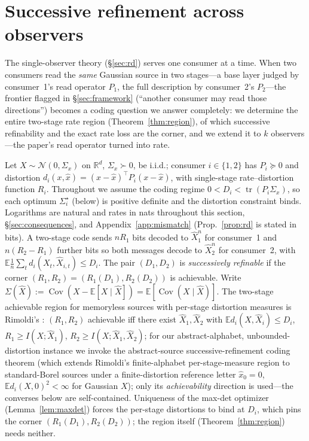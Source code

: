 \documentclass[lettersize,onecolumn]{IEEEtran}
\theoremstyle{definition}
\theoremstyle{remark}
\newcommand{\tr}{\operatorname{tr}}
\newcommand{\E}{\mathbb{E}}
\newcommand{\Cov}{\operatorname{Cov}}
\begin{document}
\section{Successive refinement across observers}\label{sec:multiobs}

The single-observer theory (\S\ref{sec:rd}) serves one consumer at a time. When two
consumers read the \emph{same} Gaussian source in two stages---a base layer judged by
consumer~1's read operator $P_1$, the full description by consumer~2's $P_2$---the
frontier flagged in \S\ref{sec:framework} (``another consumer may read those
directions'') becomes a coding question we answer completely: we determine the entire two-stage rate
region (Theorem~\ref{thm:region}), of which successive refinability and the exact rate
loss are the corner, and we extend it to $k$ observers---the paper's read operator turned
into rate.

Let $X\sim\mathcal N(0,\Sigma_x)$ on $\mathbb R^d$, $\Sigma_x\succ0$, be i.i.d.; consumer
$i\in\{1,2\}$ has $P_i\succeq0$ and distortion $d_i(x,\hat x)=(x-\hat x)^\top P_i
(x-\hat x)$, with single-stage rate--distortion function $R_i$. Throughout we assume the
coding regime $0<D_i<\tr(P_i\Sigma_x)$, so each optimum $\Sigma_i^\star$ (below) is
positive definite and the distortion constraint binds. Logarithms are natural and rates in
nats throughout this section, \S\ref{sec:consequences}, and Appendix~\ref{app:mismatch}
(Prop.~\ref{prop:rd} is stated in bits). A two-stage code sends
$nR_1$ bits decoded to $\hat X_1^n$ for consumer~1 and $n(R_2-R_1)$ further bits so both
messages decode to $\hat X_2^n$ for consumer~2, with $\E\tfrac1n\sum_t d_i(X_t,\hat
X_{i,t})\le D_i$. The pair $(D_1,D_2)$ is \emph{successively refinable} if the corner
$(R_1,R_2)=(R_1(D_1),R_2(D_2))$ is achievable. Write $\Sigma(\hat X):=\Cov(X-\E[X\mid
\hat X])=\E[\Cov(X\mid\hat X)]$. The two-stage achievable region for memoryless sources
with per-stage distortion measures is Rimoldi's \cite{rimoldi}: $(R_1,R_2)$ achievable
iff there exist $\hat X_1,\hat X_2$ with $\E d_i(X,\hat X_i)\le D_i$, $R_1\ge
I(X;\hat X_1)$, $R_2\ge I(X;\hat X_1,\hat X_2)$; for our abstract-alphabet,
unbounded-distortion instance we invoke the abstract-source successive-refinement coding
theorem \cite{kostinatuncel} (which extends Rimoldi's finite-alphabet per-stage-measure
region to standard-Borel sources under a finite-distortion reference letter $\hat x_0=0$,
$\E d_i(X,0)^2<\infty$ for Gaussian $X$); only its \emph{achievability} direction is
used---the converses below are self-contained. Uniqueness of the max-det optimizer
(Lemma~\ref{lem:maxdet}) forces the per-stage distortions to bind at $D_i$, which pins the
corner $(R_1(D_1),R_2(D_2))$; the region itself (Theorem~\ref{thm:region}) needs neither.
\end{document}
